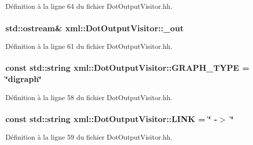 Définition à la ligne 64 du fichier DotOutputVisitor.hh.

\hypertarget{classxml_1_1_dot_output_visitor_a5bd82f9f1db24368e579e075a1929ca6}{
\subsubsection[{\_\-out}]{\setlength{\rightskip}{0pt plus 5cm}std::ostream\& {\bf xml::DotOutputVisitor::\_\-out}}}
\label{classxml_1_1_dot_output_visitor_a5bd82f9f1db24368e579e075a1929ca6}


Définition à la ligne 61 du fichier DotOutputVisitor.hh.

\hypertarget{classxml_1_1_dot_output_visitor_a5cf6c70f78fa4edced8f89d18b95c0d0}{
\subsubsection[{GRAPH\_\-TYPE}]{\setlength{\rightskip}{0pt plus 5cm}const std::string {\bf xml::DotOutputVisitor::GRAPH\_\-TYPE} = \char`\"{}digraph\char`\"{}}}
\label{classxml_1_1_dot_output_visitor_a5cf6c70f78fa4edced8f89d18b95c0d0}


Définition à la ligne 58 du fichier DotOutputVisitor.hh.

\hypertarget{classxml_1_1_dot_output_visitor_a0df19df5cbdc9101aad2e71d2e87c33c}{
\subsubsection[{LINK}]{\setlength{\rightskip}{0pt plus 5cm}const std::string {\bf xml::DotOutputVisitor::LINK} = \char`\"{} -\/$>$ \char`\"{}}}
\label{classxml_1_1_dot_output_visitor_a0df19df5cbdc9101aad2e71d2e87c33c}


Définition à la ligne 59 du fichier DotOutputVisitor.hh.

